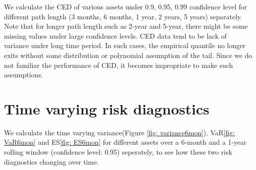 \documentclass[12pt]{article}
\begin{document}
We calculate the CED of various assets under 0.9, 0.95, 0.99 confidence level for different path length (3 months, 6 months, 1 year, 2 years, 5 years) separately. Note that for longer path length such as 2-year and 5-year, there might be some missing values under large confidence levels. CED data tend to be lack of variance under long time period. In such cases, the empirical quantile no longer exits without some distribution or polynomial assumption of the tail. Since we do not familiar the performance of CED, it becomes impropriate to make such assumptions.

\section{Time varying risk diagnostics}

We calculate the time varying variance(Figure \ref{fig: variance6mon}), VaR\ref{fig: VaR6mon} and ES\ref{fig: ES6mon}  for different assets over a 6-month and a 1-year rolling window (confidence level: 0.95) seperately, to see how these two risk diagnostics changing over time. 
\end{document}
